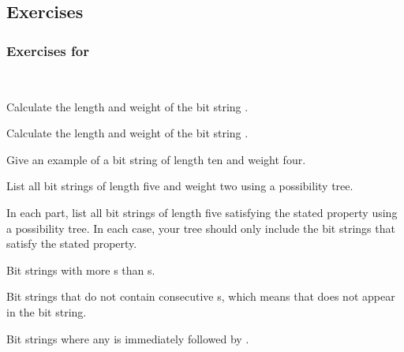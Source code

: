 
\subsection{Exercises}

    
\subsubsection*{Exercises for  \subbitstrings}

\begin{exer} [\exerP] %
\label{exer_bit_string_length}
    ~
    \begin{exerpart}
         \item Calculate the length and weight of the bit string .
        \item Calculate the length and weight of the bit string .
        \item Give an example of a bit string of length ten and weight four.  
    \end{exerpart}
\end{exer}

\begin{exer} [\exerP] %
\label{exer_bit_strings_length5_weight2}
    List all bit strings of length five and weight two using a possibility tree.
\end{exer}

\begin{exer} [\exerU] %
\label{exer_bstrees}
    In each part, list all bit strings of length five satisfying the stated property using a possibility tree.  In each case, your tree should only include the bit strings that satisfy the stated property.
    \begin{exerpart}
        \item Bit strings with more s than s.
        \item Bit strings that do not contain consecutive s, which means that  does not appear in the bit string.
        \item Bit strings where any  is immediately followed by .       
    \end{exerpart}   
\end{exer}

